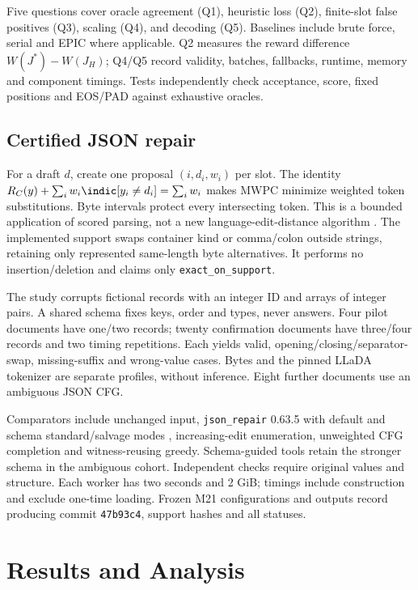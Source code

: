 Five questions cover oracle agreement (Q1), heuristic loss (Q2), finite-slot false positives (Q3), scaling (Q4), and decoding (Q5). Baselines include brute force, serial and EPIC where applicable. Q2 measures the reward difference $W(J^*)-W(J_H)$; Q4/Q5 record validity, batches, fallbacks, runtime, memory and component timings. Tests independently check acceptance, score, fixed positions and EOS/PAD against exhaustive oracles.

\subsection{Certified JSON repair}

For a draft $d$, create one proposal $(i,d_i,w_i)$ per slot. The identity
$R_C(y)+\sum_i w_i\indic[y_i\ne d_i]=\sum_iw_i$ makes MWPC minimize weighted token substitutions. Byte intervals protect every intersecting token. This is a bounded application of scored parsing, not a new language-edit-distance algorithm \cite{kociumaka2024edit}. The implemented support swaps container kind or comma/colon outside strings, retaining only represented same-length byte alternatives. It performs no insertion/deletion and claims only \texttt{exact\_on\_support}.

The study corrupts fictional records with an integer ID and arrays of integer pairs. A shared schema fixes keys, order and types, never answers. Four pilot documents have one/two records; twenty confirmation documents have three/four records and two timing repetitions. Each yields valid, opening/closing/separator-swap, missing-suffix and wrong-value cases. Bytes and the pinned LLaDA tokenizer are separate profiles, without inference. Eight further documents use an ambiguous JSON CFG.

Comparators include unchanged input, \texttt{json\_repair} 0.63.5 with default and schema standard/salvage modes \cite{baccianella2025jsonrepair}, increasing-edit enumeration, unweighted CFG completion and witness-reusing greedy. Schema-guided tools retain the stronger schema in the ambiguous cohort. Independent checks require original values and structure. Each worker has two seconds and 2 GiB; timings include construction and exclude one-time loading. Frozen M21 configurations and outputs record producing commit \texttt{47b93c4}, support hashes and all statuses.

\section{Results and Analysis}
\label{sec:resultados}

